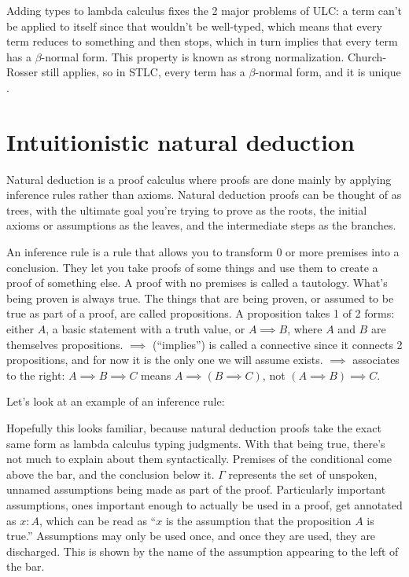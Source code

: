 \documentclass[12pt]{article}
\begin{document}

Adding types to lambda calculus fixes the 2 major problems of ULC: a term can't be applied to itself since that wouldn't be well-typed, which means that every term reduces to something and then stops, which in turn implies that every term has a $\beta$-normal form. This property is known as strong normalization. Church-Rosser still applies, so in STLC, every term has a $\beta$-normal form, and it is unique \cite{selinger}.

\section{Intuitionistic natural deduction}

Natural deduction is a proof calculus where proofs are done mainly by applying inference rules rather than axioms. Natural deduction proofs can be thought of as trees, with the ultimate goal you're trying to prove as the roots, the initial axioms or assumptions as the leaves, and the intermediate steps as the branches.

An inference rule is a rule that allows you to transform 0 or more premises into a conclusion. They let you take proofs of some things and use them to create a proof of something else. A proof with no premises is called a tautology. What's being proven is always true. The things that are being proven, or assumed to be true as part of a proof, are called propositions. A proposition takes 1 of 2 forms: either $A$, a basic statement with a truth value, or $A \implies B$, where $A$ and $B$ are themselves propositions. $\implies$ (``implies'') is called a connective since it connects 2 propositions, and for now it is the only one we will assume exists. $\implies$ associates to the right: $A \implies B \implies C$ means $A \implies (B \implies C)$, not $(A \implies B) \implies C$.

Let's look at an example of an inference rule:

\begin{prooftree}
\end{prooftree}

Hopefully this looks familiar, because natural deduction proofs take the exact same form as lambda calculus typing judgments. With that being true, there's not much to explain about them syntactically. Premises of the conditional come above the bar, and the conclusion below it. $\Gamma$ represents the set of unspoken, unnamed assumptions being made as part of the proof. Particularly important assumptions, ones important enough to actually be used in a proof, get annotated as $x: A$, which can be read as ``$x$ is the assumption that the proposition $A$ is true.'' Assumptions may only be used once, and once they are used, they are discharged. This is shown by the name of the assumption appearing to the left of the bar.
\end{document}

